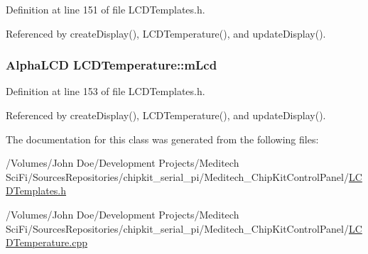 Definition at line 151 of file L\-C\-D\-Templates.\-h.



Referenced by create\-Display(), L\-C\-D\-Temperature(), and update\-Display().

\hypertarget{class_l_c_d_temperature_a6619ac859b70619851329ee8b8eda15d}{
\subsubsection[{m\-Lcd}]{\setlength{\rightskip}{0pt plus 5cm}Alpha\-L\-C\-D L\-C\-D\-Temperature\-::m\-Lcd\hspace{0.3cm}{\ttfamily [private]}}}\label{class_l_c_d_temperature_a6619ac859b70619851329ee8b8eda15d}


Definition at line 153 of file L\-C\-D\-Templates.\-h.



Referenced by create\-Display(), L\-C\-D\-Temperature(), and update\-Display().



The documentation for this class was generated from the following files\-:\begin{DoxyCompactItemize}
\item 
/\-Volumes/\-John Doe/\-Development Projects/\-Meditech Sci\-Fi/\-Sources\-Repositories/chipkit\-\_\-serial\-\_\-pi/\-Meditech\-\_\-\-Chip\-Kit\-Control\-Panel/\hyperlink{_l_c_d_templates_8h}{L\-C\-D\-Templates.\-h}\item 
/\-Volumes/\-John Doe/\-Development Projects/\-Meditech Sci\-Fi/\-Sources\-Repositories/chipkit\-\_\-serial\-\_\-pi/\-Meditech\-\_\-\-Chip\-Kit\-Control\-Panel/\hyperlink{_l_c_d_temperature_8cpp}{L\-C\-D\-Temperature.\-cpp}\end{DoxyCompactItemize}
